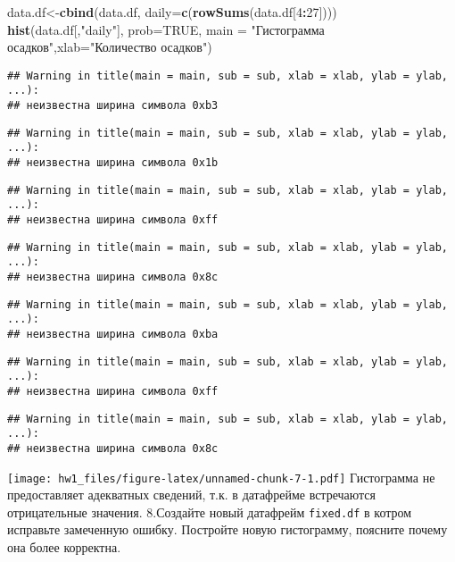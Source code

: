 \documentclass[]{article}
\newenvironment{Shaded}{\begin{snugshade}}{\end{snugshade}}
\newcommand{\KeywordTok}[1]{\textcolor[rgb]{0.13,0.29,0.53}{\textbf{#1}}}
\newcommand{\DataTypeTok}[1]{\textcolor[rgb]{0.13,0.29,0.53}{#1}}
\newcommand{\DecValTok}[1]{\textcolor[rgb]{0.00,0.00,0.81}{#1}}
\newcommand{\StringTok}[1]{\textcolor[rgb]{0.31,0.60,0.02}{#1}}
\newcommand{\OtherTok}[1]{\textcolor[rgb]{0.56,0.35,0.01}{#1}}
\newcommand{\OperatorTok}[1]{\textcolor[rgb]{0.81,0.36,0.00}{\textbf{#1}}}
\newcommand{\NormalTok}[1]{#1}
\begin{document}
\begin{Shaded}
\begin{Highlighting}[]
\NormalTok{data.df<-}\KeywordTok{cbind}\NormalTok{(data.df, }\DataTypeTok{daily=}\KeywordTok{c}\NormalTok{(}\KeywordTok{rowSums}\NormalTok{(data.df[}\DecValTok{4}\OperatorTok{:}\DecValTok{27}\NormalTok{])))}
\KeywordTok{hist}\NormalTok{(data.df[,}\StringTok{"daily"}\NormalTok{], }\DataTypeTok{prob=}\OtherTok{TRUE}\NormalTok{, }\DataTypeTok{main =} \StringTok{"Гистограмма осадков"}\NormalTok{,}\DataTypeTok{xlab=}\StringTok{"Количество осадков"}\NormalTok{)}
\end{Highlighting}
\end{Shaded}

\begin{verbatim}
## Warning in title(main = main, sub = sub, xlab = xlab, ylab = ylab, ...):
## неизвестна ширина символа 0xb3
\end{verbatim}

\begin{verbatim}
## Warning in title(main = main, sub = sub, xlab = xlab, ylab = ylab, ...):
## неизвестна ширина символа 0x1b
\end{verbatim}

\begin{verbatim}
## Warning in title(main = main, sub = sub, xlab = xlab, ylab = ylab, ...):
## неизвестна ширина символа 0xff
\end{verbatim}

\begin{verbatim}
## Warning in title(main = main, sub = sub, xlab = xlab, ylab = ylab, ...):
## неизвестна ширина символа 0x8c
\end{verbatim}

\begin{verbatim}
## Warning in title(main = main, sub = sub, xlab = xlab, ylab = ylab, ...):
## неизвестна ширина символа 0xba
\end{verbatim}

\begin{verbatim}
## Warning in title(main = main, sub = sub, xlab = xlab, ylab = ylab, ...):
## неизвестна ширина символа 0xff
\end{verbatim}

\begin{verbatim}
## Warning in title(main = main, sub = sub, xlab = xlab, ylab = ylab, ...):
## неизвестна ширина символа 0x8c
\end{verbatim}

\texttt{[image: hw1\_files/figure-latex/unnamed-chunk-7-1.pdf]}
Гистограмма не предоставляет адекватных сведений, т.к. в датафрейме
встречаются отрицательные значения. 8.Создайте новый датафрейм
\texttt{fixed.df} в котром исправьте замеченную ошибку. Постройте новую
гистограмму, поясните почему она более корректна.
\end{document}
